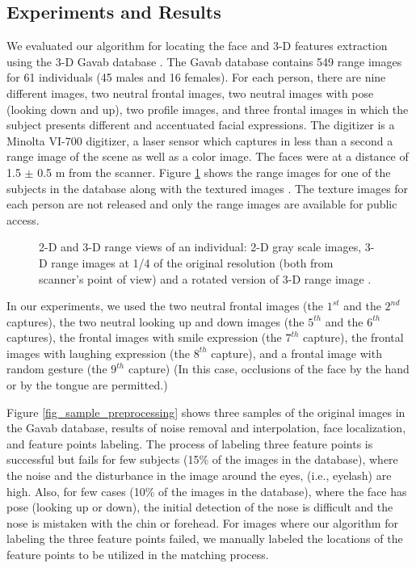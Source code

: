 \subsection{Experiments and Results}
We evaluated our algorithm for locating the face and 3-D features
extraction using the 3-D Gavab database \cite{moreno04}. The Gavab
database contains 549 range images for 61 individuals (45 males and
16 females). For each person, there are nine different images, two
neutral frontal images, two neutral images with pose (looking down
and up), two profile images, and three frontal images in which the
subject presents different and accentuated facial expressions. The
digitizer is a Minolta VI-700 digitizer, a laser sensor which
captures in less than a second a range image of the scene as well as
a color image. The faces were at a distance of 1.5 $\pm$ 0.5 m from
the scanner. Figure \ref{fig_database_sample} shows the range images
for one of the subjects in the database along with the textured
images \cite{moreno04}. The texture images for each person are not
released and only the range images are available for public access.
\begin{figure}[tbp]
\begin{center}
 \caption{2-D and 3-D range views of an individual: 2-D gray
scale images, 3-D range images at 1/4 of the original resolution
(both from scanner's point of view) and a rotated version of 3-D
range image \cite{moreno04}.}\label{fig_database_sample}
\end{center}
\end{figure}

In our experiments, we used the two neutral frontal images (the
$1^{st}$ and the $2^{nd}$ captures), the two neutral looking up and
down images (the $5^{th}$ and the $6^{th}$ captures), the frontal
images with smile expression (the $7^{th}$ capture), the frontal
images with laughing expression (the $8^{th}$ capture), and a
frontal image with random gesture (the $9^{th}$ capture) (In this
case, occlusions of the face by the hand or by the tongue are
permitted.)

Figure \ref{fig_sample_preprocessing} shows three samples of the
original images in the Gavab database, results of noise removal and
interpolation, face localization, and feature points labeling. The
process of labeling three feature points is successful but fails for
few subjects (15\% of the images in the database), where the noise
and the disturbance in the image around the eyes, (i.e., eyelash)
are high. Also, for few cases (10\% of the images in the database),
where the face has pose (looking up or down), the initial detection
of the nose is difficult and the nose is mistaken with the chin or
forehead. For images where our algorithm for labeling the three
feature points failed, we manually labeled the locations of the
feature points to be utilized in the matching process.

